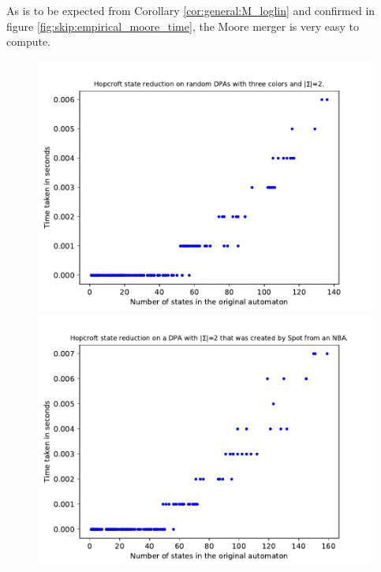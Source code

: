 As is to be expected from Corollary \ref{cor:general:M_loglin} and confirmed in figure \ref{fig:skip:empirical_moore_time}, the Moore merger is very easy to compute.


\begin{figure}
	\centering
	\begin{minipage}{0.49\textwidth}
		\includegraphics[page=6,height=.3\textheight]{../data/analysis/hopcroft/gendet_ap1.pdf} 
		\includegraphics[page=6,height=.3\textheight]{../data/analysis/hopcroft/detspot_ap1.pdf} 

\end{minipage}
\end{figure}
